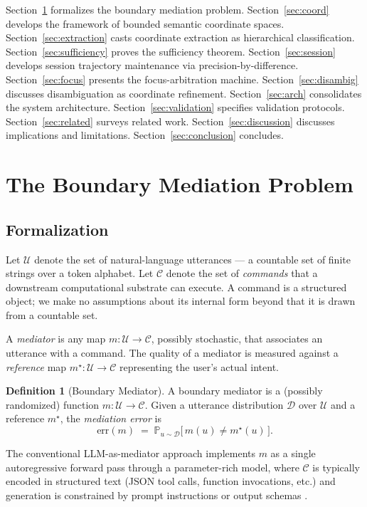 \documentclass[11pt,twocolumn,a4paper]{article}
\theoremstyle{definition}
\newtheorem{definition}[theorem]{Definition}
\theoremstyle{remark}
\renewcommand{\Pr}{\mathbb{P}}
\newcommand{\Cc}{\mathcal{C}}
\newcommand{\Uc}{\mathcal{U}}
\begin{document}
Section~\ref{sec:problem} formalizes the boundary mediation problem.
Section~\ref{sec:coord} develops the framework of bounded semantic coordinate spaces.
Section~\ref{sec:extraction} casts coordinate extraction as hierarchical classification.
Section~\ref{sec:sufficiency} proves the sufficiency theorem.
Section~\ref{sec:session} develops session trajectory maintenance via precision-by-difference.
Section~\ref{sec:focus} presents the focus-arbitration machine.
Section~\ref{sec:disambig} discusses disambiguation as coordinate refinement.
Section~\ref{sec:arch} consolidates the system architecture.
Section~\ref{sec:validation} specifies validation protocols.
Section~\ref{sec:related} surveys related work.
Section~\ref{sec:discussion} discusses implications and limitations.
Section~\ref{sec:conclusion} concludes.

\section{The Boundary Mediation Problem}
\label{sec:problem}

\subsection{Formalization}

Let $\Uc$ denote the set of natural-language utterances --- a countable set of finite strings over a token alphabet. Let $\Cc$ denote the set of \emph{commands} that a downstream computational substrate can execute. A command is a structured object; we make no assumptions about its internal form beyond that it is drawn from a countable set.

A \emph{mediator} is any map $m: \Uc \to \Cc$, possibly stochastic, that associates an utterance with a command. The quality of a mediator is measured against a \emph{reference} map $m^\star: \Uc \to \Cc$ representing the user's actual intent.

\begin{definition}[Boundary Mediator]
\label{def:mediator}
A boundary mediator is a (possibly randomized) function $m: \Uc \to \Cc$. Given a utterance distribution $\mathcal{D}$ over $\Uc$ and a reference $m^\star$, the \emph{mediation error} is
\[
\mathrm{err}(m) \;=\; \Pr_{u \sim \mathcal{D}}\bigl[\, m(u) \neq m^\star(u) \,\bigr].
\]
\end{definition}

The conventional LLM-as-mediator approach implements $m$ as a single autoregressive forward pass through a parameter-rich model, where $\Cc$ is typically encoded in structured text (JSON tool calls, function invocations, etc.) and generation is constrained by prompt instructions or output schemas \citep{schick2024toolformer}.
\end{document}
